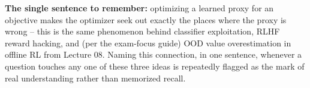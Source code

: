\documentclass[11pt]{article}
\begin{document}
\noindent\textbf{The single sentence to remember:} optimizing a learned proxy for
an objective makes the optimizer seek out exactly the places where the proxy is
wrong -- this is the same phenomenon behind classifier exploitation, RLHF reward
hacking, and (per the exam-focus guide) OOD value overestimation in offline RL
from Lecture 08. Naming this connection, in one sentence, whenever a question
touches any one of these three ideas is repeatedly flagged as the mark of real
understanding rather than memorized recall.
\end{document}
